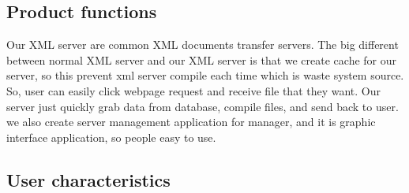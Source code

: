 \subsection{Product functions}
% 

Our XML server are common XML documents transfer servers.
The big different between normal XML server and our XML server is that we create cache for our server, so this prevent xml server compile each time which is waste system source.
So, user can easily click webpage request and receive file that they want.
Our server just quickly grab data from database, compile files, and send back to user.
we also create server management application for manager, and it is graphic interface application, so people easy to use.

\subsection{User characteristics}

